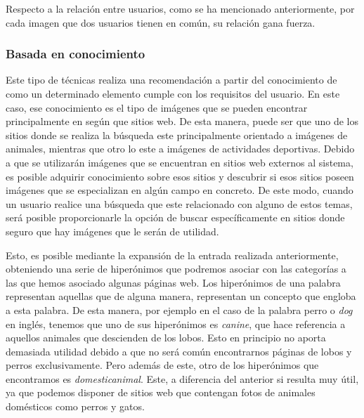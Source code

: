 Respecto a la relación entre usuarios, como se ha mencionado anteriormente, por cada imagen que dos usuarios tienen en común, su relación gana fuerza.\\ 





\subsubsection{Basada en conocimiento}

Este tipo de técnicas realiza una recomendación a partir del conocimiento de como un determinado elemento cumple con los requisitos del usuario. En este caso, ese conocimiento es el tipo de imágenes que se pueden encontrar principalmente en según que sitios web. De esta manera, puede ser que uno de los sitios donde se realiza la búsqueda este principalmente orientado a imágenes de animales, mientras que otro lo este a imágenes de actividades deportivas. Debido a que se utilizarán imágenes que se encuentran en sitios web externos al sistema, es posible adquirir conocimiento sobre esos sitios y descubrir si esos sitios poseen imágenes que se especializan en algún campo en concreto. De este modo, cuando un usuario realice una búsqueda que este relacionado con alguno de estos temas, será posible proporcionarle la opción de buscar específicamente en sitios donde seguro que hay imágenes que le serán de utilidad.

Esto, es posible mediante la expansión de la entrada realizada anteriormente, obteniendo una serie de hiperónimos que podremos asociar con las categorías a las que hemos asociado algunas páginas web.  Los hiperónimos de una palabra representan aquellas que de alguna manera, representan un concepto que engloba a esta palabra. De esta manera, por ejemplo en el caso de la palabra perro o \textit{dog} en inglés, tenemos que uno de sus hiperónimos es \textit{canine}, que hace referencia a aquellos animales que descienden de los lobos. Esto en principio no aporta demasiada utilidad debido a que no será común encontrarnos páginas de lobos y perros exclusivamente. Pero además de este, otro de los hiperónimos que encontramos es \textit{domestic\textunderscore animal}. Este, a diferencia del anterior si resulta muy útil, ya que podemos disponer de sitios web que contengan fotos de animales domésticos como perros y gatos.

